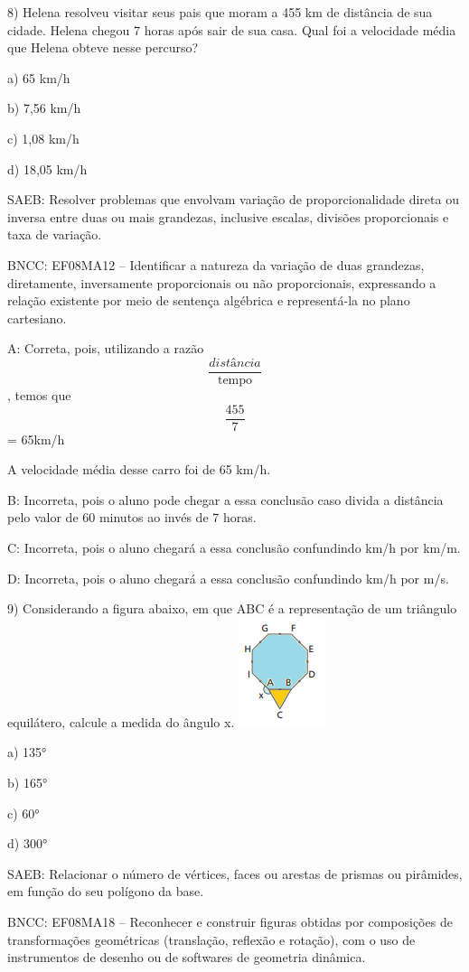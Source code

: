 8) Helena resolveu visitar seus pais que moram a 455 km de distância de
sua cidade. Helena chegou 7 horas após sair de sua casa. Qual foi a
velocidade média que Helena obteve nesse percurso?

a) 65 km/h

b) 7,56 km/h

c) 1,08 km/h

d) 18,05 km/h

SAEB: Resolver problemas que envolvam variação de proporcionalidade
direta ou inversa entre duas ou mais grandezas, inclusive escalas,
divisões proporcionais e taxa de variação.

BNCC: EF08MA12 -- Identificar a natureza da variação de duas grandezas,
diretamente, inversamente proporcionais ou não proporcionais,
expressando a relação existente por meio de sentença algébrica e
representá-la no plano cartesiano.

A: Correta, pois, utilizando a razão \[\frac{distância}{\text{tempo}}\],
temos que \[\frac{455}{7}\] = 65km/h

A velocidade média desse carro foi de 65 km/h.

B: Incorreta, pois o aluno pode chegar a essa conclusão caso divida a
distância pelo valor de 60 minutos ao invés de 7 horas.

C: Incorreta, pois o aluno chegará a essa conclusão confundindo km/h por
km/m.

D: Incorreta, pois o aluno chegará a essa conclusão confundindo km/h por
m/s.

9) Considerando a figura abaixo, em que ABC é a representação de um
triângulo equilátero, calcule a medida do ângulo x.
\includegraphics[width=0.98958in,height=1.26042in]{./imgSAEB_8_MAT/media/image56.png}

a) 135°

b) 165°

c) 60°

d) 300°

SAEB: Relacionar o número de vértices, faces ou arestas de prismas ou
pirâmides, em função do seu polígono da base.

BNCC: EF08MA18 -- Reconhecer e construir figuras obtidas por composições
de transformações geométricas (translação, reflexão e rotação), com o
uso de instrumentos de desenho ou de softwares de geometria dinâmica.


